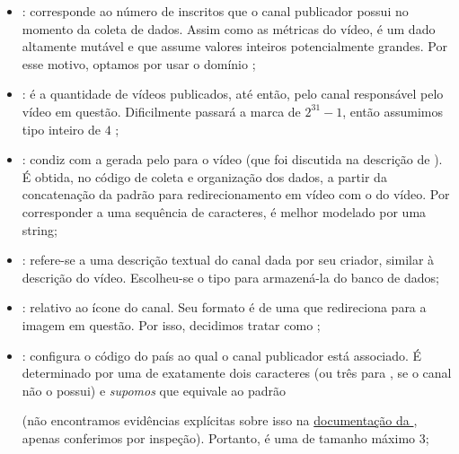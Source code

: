 \begin{itemize}
    \item {}: corresponde ao número de inscritos que o canal publicador possui no momento da coleta de dados. Assim como as métricas do vídeo, é um dado altamente mutável e que assume valores inteiros potencialmente grandes. Por esse motivo, optamos por usar o domínio ;
    \item {}: é a quantidade de vídeos publicados, até então, pelo canal responsável pelo vídeo em questão. Dificilmente passará a marca de $2^{31} - 1$, então assumimos tipo inteiro de $4$ ;
    \item {}: condiz com a  gerada pelo  para o vídeo (que foi discutida na descrição de ). É obtida, no código de coleta e organização dos dados, a partir da concatenação da  padrão para redirecionamento em vídeo com o  do vídeo. Por corresponder a uma sequência de caracteres, é melhor modelado por uma string;
    \item {}: refere-se a uma descrição textual do canal dada por seu criador, similar à descrição do vídeo. Escolheu-se o tipo  para armazená-la do banco de dados;
    \item {}: relativo ao ícone do canal. Seu formato é de uma  que redireciona para a imagem em questão. Por isso, decidimos tratar como ;
    \item {}: configura o código do país ao qual o canal publicador está associado. É determinado por uma  de exatamente dois caracteres (ou três para , se o canal não o possui) e \emph{supomos} que equivale ao padrão \href{https://www.iso.org/iso-3166-country-codes.html}{}\cite{iso-3166}

      (não encontramos evidências explícitas sobre isso na \href{https://developers.google.com/youtube/v3/docs/channels?hl=pt-br#snippet.country}{documentação da }, apenas conferimos por inspeção). Portanto, é uma  de tamanho máximo 3;


\end{itemize}
